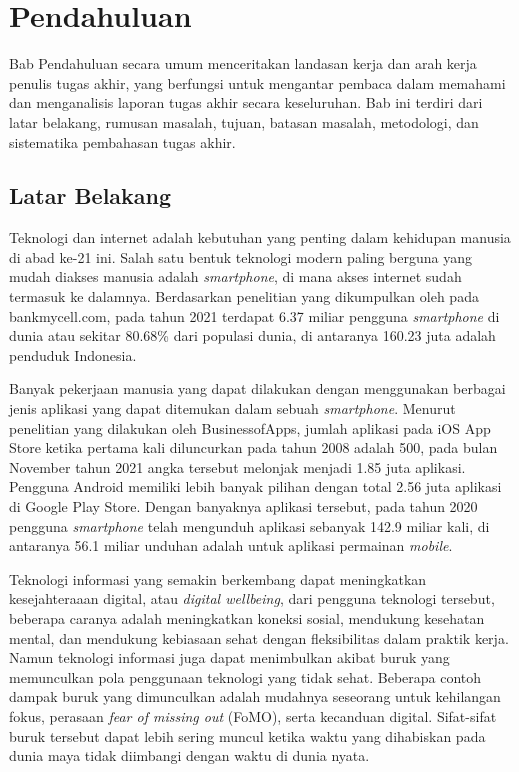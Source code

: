 \chapter{Pendahuluan}

Bab Pendahuluan secara umum menceritakan landasan kerja dan arah kerja penulis tugas akhir, yang berfungsi untuk mengantar pembaca dalam memahami dan menganalisis laporan tugas akhir secara keseluruhan. Bab ini terdiri dari latar belakang, rumusan masalah, tujuan, batasan masalah, metodologi, dan sistematika pembahasan tugas akhir.

\section{Latar Belakang}
\label{sec:latarbelakang}

Teknologi dan internet adalah kebutuhan yang penting dalam kehidupan manusia di abad ke-21 ini. Salah satu bentuk teknologi modern paling berguna yang mudah diakses manusia adalah \emph{smartphone}, di mana akses internet sudah termasuk ke dalamnya. Berdasarkan penelitian yang dikumpulkan oleh \textcite{turner2022howmanysmartphones} pada bankmycell.com, pada tahun 2021 terdapat 6.37 miliar pengguna \emph{smartphone} di dunia atau sekitar 80.68\% dari populasi dunia, di antaranya 160.23 juta adalah penduduk Indonesia.

Banyak pekerjaan manusia yang dapat dilakukan dengan menggunakan berbagai jenis aplikasi yang dapat ditemukan dalam sebuah \emph{smartphone}. Menurut penelitian yang dilakukan oleh BusinessofApps, jumlah aplikasi pada iOS App Store ketika pertama kali diluncurkan pada tahun 2008 adalah 500, pada bulan November tahun 2021 angka tersebut melonjak menjadi 1.85 juta aplikasi. Pengguna Android memiliki lebih banyak pilihan dengan total 2.56 juta aplikasi di Google Play Store. Dengan banyaknya aplikasi tersebut, pada tahun 2020 pengguna \emph{smartphone} telah mengunduh aplikasi sebanyak 142.9 miliar kali, di antaranya 56.1 miliar unduhan adalah untuk aplikasi permainan \emph{mobile}.

Teknologi informasi yang semakin berkembang dapat meningkatkan kesejahteraaan digital, atau \textit{digital wellbeing}, dari pengguna teknologi tersebut, beberapa caranya adalah meningkatkan koneksi sosial, mendukung kesehatan mental, dan mendukung kebiasaan sehat dengan fleksibilitas dalam praktik kerja. Namun teknologi informasi juga dapat menimbulkan akibat buruk yang memunculkan pola penggunaan teknologi yang tidak sehat. Beberapa contoh dampak buruk yang dimunculkan adalah mudahnya seseorang untuk kehilangan fokus, perasaan \emph{fear of missing out} (FoMO), serta kecanduan digital. Sifat-sifat buruk tersebut dapat lebih sering muncul ketika waktu yang dihabiskan pada dunia maya tidak diimbangi dengan waktu di dunia nyata. \parencite{ALMOURAD2021101778}

